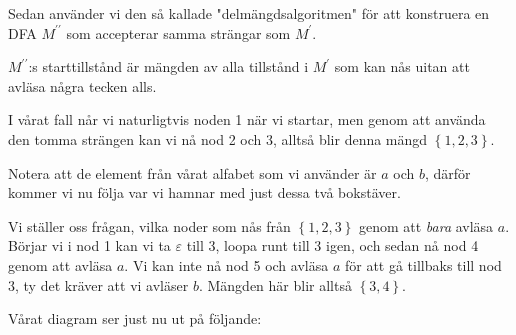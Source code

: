 \begin{figure}[ht]
    \centering
    \caption{}
\end{figure}\par
\noindent Sedan använder vi den så kallade "delmängdsalgoritmen" för att konstruera en DFA $M^{\prime\prime}$ som accepterar samma strängar som $M^{\prime}$.\par
\noindent $M^{\prime\prime}$:s starttillstånd är mängden av alla tillstånd i $M^{\prime}$ som kan nås uitan att avläsa några tecken alls.\par\bigskip
\noindent I vårat fall når vi naturligtvis noden 1 när vi startar, men genom att använda den tomma strängen kan vi nå nod 2 och 3, alltså blir denna mängd $\left\{1,2,3\right\}$.\par
\noindent Notera att de element från vårat alfabet som vi använder är $a$ och $b$, därför kommer vi nu följa var vi hamnar med just dessa två bokstäver.\par\bigskip
\noindent Vi ställer oss frågan, vilka noder som nås från $\left\{1,2,3\right\}$ genom att \textit{bara} avläsa $a$. Börjar vi i nod 1 kan vi ta $\varepsilon$ till 3, loopa runt till 3 igen, och sedan nå nod 4 genom att avläsa $a$. Vi kan inte nå nod 5 och avläsa $a$ för att gå tillbaks till nod 3, ty det kräver att vi avläser $b$. Mängden här blir alltså $\left\{3,4\right\}$.\par\bigskip
\noindent Vårat diagram ser just nu ut på följande:
\begin{figure}[ht]
    \centering
    \caption{}
\end{figure}
